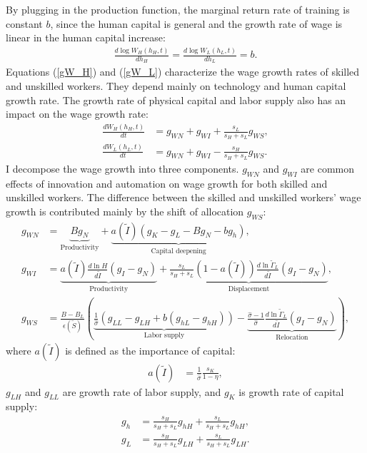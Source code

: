 \documentclass[12pt]{article}
\begin{document}
By plugging in the production function, the marginal return rate of training is constant $b$, since the human capital is general and the growth rate of wage is linear in the human capital increase: 
\begin{align*}
\frac{d\log W_H(h_H,t)}{dh_H} = \frac{d\log W_L(h_L,t)}{dh_L} = b.
\end{align*}
Equations (\ref{gW_H}) and (\ref{gW_L}) characterize the wage growth rates of skilled and unskilled workers. They depend mainly on technology and human capital growth rate. The growth rate of physical capital and labor supply also has an impact on the wage growth rate:
\begin{align}
\label{gW_H}
\frac{dW_H(h_H,t)}{dt} &= g_{WN}+g_{WI}+\frac{s_L}{s_H+s_L}g_{WS},\\
\label{gW_L}
\frac{dW_L(h_L,t)}{dt}  &= g_{WN}+g_{WI}-\frac{s_H}{s_H+s_L}g_{WS}.
\end{align}
I decompose the wage growth into three components. $g_{WN}$ and $g_{WI}$ are common effects of innovation and automation on wage growth for both skilled and unskilled workers. The difference between the skilled and unskilled workers' wage growth is contributed mainly by the shift of allocation $g_{WS}$:  
\begin{align}
\label{g_WN}
g_{WN} &= \underbrace{Bg_N}_{\text{Productivity}}+\underbrace{a(\tilde{I})(g_K-g_L-Bg_N-bg_h)}_{\text{Capital deepening}}, \\
\label{g_WI}
g_{WI} &= \underbrace{a(\tilde{I})\frac{d\ln H}{d\tilde{I}}(g_I-g_N)}_{\text{Productivity}}+\underbrace{\frac{s_L}{s_H+s_L}(1-a(\tilde{I}))\frac{d\ln \tilde{\Gamma}_L}{d\tilde{I}}(g_I-g_N)}_{\text{Displacement}}, \\
\label{g_WS}
g_{WS}&= \frac{B-B_L}{\epsilon(\tilde{S})}(\underbrace{\frac{1}{\hat{\sigma}}(g_{LL}-g_{LH}+b(g_{hL}-g_{hH}))}_{\text{Labor supply}}-\underbrace{\frac{\hat{\sigma}-1}{\hat{\sigma}}\frac{d\ln \tilde{\Gamma}_L}{d\tilde{I}}(g_I-g_N)}_{\text{Relocation}}),
\end{align}
where $a(\tilde{I})$ is defined as the importance of capital:
\begin{align*}
a(\tilde{I}) &= \frac{1}{\hat{\sigma}}\frac{s_K}{1-\eta},
\end{align*}
$g_{LH}$ and $g_{LL}$ are growth rate of labor supply, and $g_K$ is growth rate of capital supply:
\begin{align*}
g_h &= \frac{s_H}{s_H+s_L}g_{hH}+\frac{s_L}{s_H+s_L}g_{hH}, \\
g_L &= \frac{s_H}{s_H+s_L}g_{LH}+\frac{s_L}{s_H+s_L}g_{LH}.
\end{align*}
\end{document}
